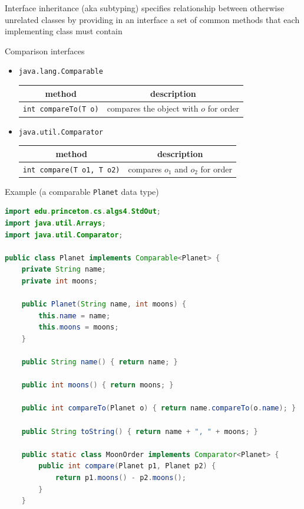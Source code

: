 \documentclass[8pt,a4paper,compress]{beamer}
\begin{document}
\begin{frame}[fragile]
Interface inheritance (aka subtyping) specifies relationship between otherwise unrelated classes by providing in an interface a set of common methods that each implementing class must contain

\bigskip

Comparison interfaces
\begin{itemize}
\item \lstinline{java.lang.Comparable}
\begin{center}
\begin{tabular}{cc}
method & description \\ \hline
\lstinline$int compareTo(T o)$ & compares the object with $o$ for order
\end{tabular} 
\end{center}

\item \lstinline{java.util.Comparator}
\begin{center}
\begin{tabular}{cc}
method & description \\ \hline
\lstinline$int compare(T o1, T o2)$ & compares $o_1$ and $o_2$ for order
\end{tabular} 
\end{center}
\end{itemize}
\end{frame}

\begin{frame}[fragile]
Example (a comparable \lstinline{Planet} data type)
\begin{lstlisting}[language=Java]
import edu.princeton.cs.algs4.StdOut;
import java.util.Arrays;
import java.util.Comparator;

public class Planet implements Comparable<Planet> {
    private String name;
    private int moons;

    public Planet(String name, int moons) {
        this.name = name;
        this.moons = moons;
    }
    
    public String name() { return name; }

    public int moons() { return moons; }

    public int compareTo(Planet o) { return name.compareTo(o.name); }
    
    public String toString() { return name + ", " + moons; }

    public static class MoonOrder implements Comparator<Planet> {
        public int compare(Planet p1, Planet p2) {
            return p1.moons() - p2.moons();
        }
    }
\end{lstlisting}
\end{frame}
\end{document}
